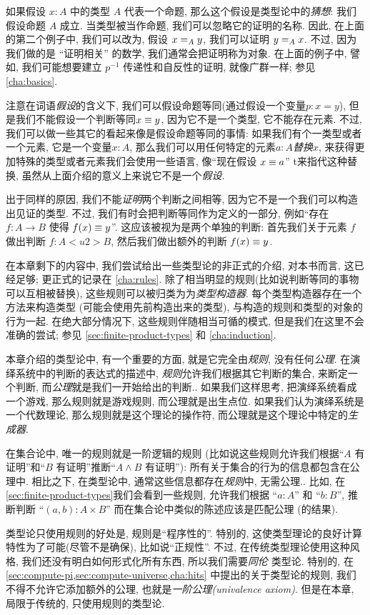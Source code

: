 如果假设 $x:A$ 中的类型 $A$ 代表一个命题, 那么这个假设是类型论中的\emph{猜想}: %
我们假设命题 $A$ 成立. 当类型被当作命题, 我们可以忽略它的证明的名称. 因此, 在上面的第二个例子中, 我们可以改为, 假设 $\id[A]{x}{y}$, 我们可以证明 $\id[A]{y}{x}$. 不过, 因为我们做的是 ``证明相关'' 的数学, %
我们通常会把证明称为对象. 在上面的例子中, 譬如, 我们可能想要建立 $p^{-1}$ 传递性和自反性的证明, 就像广群一样; 参见 \cref{cha:basics}. 

注意在词语\emph{假设}的含义下, 我们可以假设命题等同(通过假设一个变量$p:x=y$), 但是我们不能假设一个判断等同$x\jdeq y$, 因为它不是一个类型, 它不能存在元素. 不过, 我们可以做一些其它的看起来像是假设命题等同的事情: 如果我们有个一类型或者一个元素, 它是一个变量$x:A$, 那么我们可以用任何特定的元素$a:A$\emph{替换}$x$, 来获得更加特殊的类型或者元素我们会使用一些语言, 像``现在假设 $x\jdeq a$'' t来指代这种替换, 虽然从上面介绍的意义上来说它不是一个\emph{假设}. %

出于同样的原因, 我们不能\emph{证明}两个判断之间相等, 因为它不是一个我们可以构造出见证的类型. 不过, 我们有时会把判断等同作为定义的一部分, 例如``存在 $f:A\to B$ 使得 $f(x)\jdeq y$''. 这应该被视为是两个单独的判断: 首先我们关于元素 $f$ 做出判断 $f:A<u2> B$, 然后我们做出额外的判断 $f(x)\jdeq y$. 

在本章剩下的内容中, 我们尝试给出一些类型论的非正式的介绍, 对本书而言, 这已经足够; 更正式的记录在 \cref{cha:rules}. 除了相当明显的规则(比如说判断等同的事物可以互相被替换), 这些规则可以被归类为为\emph{类型构造器}. 每个类型构造器存在一个方法来构造类型 (可能会使用先前构造出来的类型), 与构造的规则和类型的对象的行为一起. 在绝大部分情况下, 这些规则伴随相当可循的模式, 但是我们在这里不会准确的尝试; 参见 \cref{sec:finite-product-types} 和 \cref{cha:induction}. 


%
%
本章介绍的类型论中, 有一个重要的方面, 就是它完全由\emph{规则}, 没有任何\emph{公理}. 在演绎系统中的判断的表达式的描述中, \emph{规则}允许我们根据其它判断的集合, 来断定一个判断, 而\emph{公理}就是我们一开始给出的判断.. 如果我们这样思考, 把演绎系统看成一个游戏, 那么规则就是游戏规则, 而公理就是出生点位. 如果我们认为演绎系统是一个代数理论, 那么规则就是这个理论的操作符, 而公理就是这个理论中特定的\emph{生成器}.

在集合论中, 唯一的规则就是一阶逻辑的规则 (比如说这些规则允许我们根据``$A$ 有证明''和``$B$ 有证明''推断``$A\wedge B$ 有证明''): 所有关于集合的行为的信息都包含在公理中. 相比之下, 在类型论中, 通常这些信息都存在\emph{规则}中, 无需公理.. 比如, 在\cref{sec:finite-product-types}我们会看到一些规则, 允许我们根据 ``$a:A$'' 和 ``$b:B$'', 推断判断 ``$(a,b):A\times B$''  而在集合论中类似的陈述应该是匹配公理 (的结果). 

类型论只使用规则的好处是, 规则是``程序性的''. 特别的, 这使类型理论的良好计算特性为了可能(尽管不是确保), 比如说``正规性''. 不过, 在传统类型理论使用这种风格, 我们还没有明白如何形式化所有东西, 所以我们需要\emph{同伦} 类型论. 特别的, 在\cref{sec:compute-pi,sec:compute-universe,cha:hits} 中提出的关于类型论的规则, 我们不得不允许它添加额外的公理, 也就是\emph{一阶公理(univalence axiom)}. 但是在本章, 局限于传统的, 只使用规则的类型论.